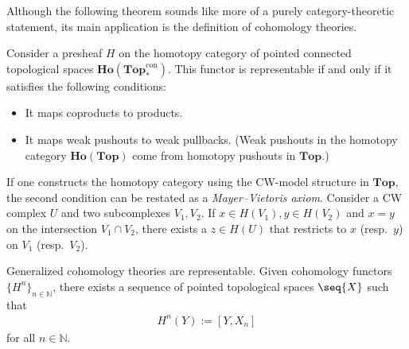     Although the following theorem sounds like more of a purely category-theoretic statement, its main application is the definition of cohomology theories.
    \begin{theorem}\label{topology:brown}
        Consider a presheaf $H$ on the homotopy category of pointed connected topological spaces $\mathbf{Ho}(\mathbf{Top}^{\text{con}}_*)$. This functor is representable if and only if it satisfies the following conditions:
        \begin{itemize}
            \item It maps coproducts to products.
            \item It maps weak pushouts to weak pullbacks. (Weak pushouts in the homotopy category $\mathbf{Ho}(\mathbf{Top})$ come from homotopy pushouts in $\mathbf{Top}$.)
        \end{itemize}
    \end{theorem}
    \begin{remark}
        If one constructs the homotopy category using the CW-model structure in $\mathbf{Top}$, the second condition can be restated as a \textit{Mayer--Vietoris axiom}. Consider a CW complex $U$ and two subcomplexes $V_1,V_2$. If $x\in H(V_1),y\in H(V_2)$ and $x=y$ on the intersection $V_1\cap V_2$, there exists a $z\in H(U)$ that restricts to $x$ (resp.~$y$) on $V_1$ (resp.~$V_2$).
    \end{remark}
    \begin{result}[Cohomology]
        Generalized cohomology theories are representable. Given cohomology functors $\{H^n\}_{n\in\mathbb{N}}$, there exists a sequence of pointed topological spaces $\seq{X}$ such that
        \begin{gather}
            H^n(Y) := [Y,X_n]
        \end{gather}
        for all $n\in\mathbb{N}$.
    \end{result}

